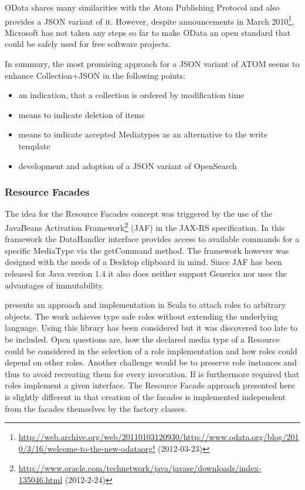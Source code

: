\documentclass[12pt,a4paper,twoside]{scrartcl}		%
\newcommand{\citeurl}[2]{\url{#1} (#2)}
\begin{document}
OData shares many similarities with the Atom Publishing Protocol and also
provides a JSON variant of it. However, despite announcements in March
2010\footnote{\citeurl{http://web.archive.org/web/20110103120930/http://www.odata.org/blog/2010/3/16/welcome-to-the-new-odataorg!}{2012-03-23}},
Microsoft has not taken any steps so far to make OData an open standard that
could be safely used for free software projects.

In summary, the most promising approach for a JSON variant of ATOM seems to
enhance Collection+JSON in the following points:

\begin{itemize}
\item an indication, that a collection is ordered by modification time
\item means to indicate deletion of items
\item means to indicate accepted Mediatypes as an alternative to the write
  template
\item development and adoption of a JSON variant of OpenSearch
\end{itemize}


\subsubsection{Resource Facades}
\label{sec:resourcefacadesfuture-work}

The idea for the Resource Facades concept was triggered by the use of the
JavaBeans Activation
Framework\footnote{\citeurl{http://www.oracle.com/technetwork/java/javase/downloads/index-135046.html}{2012-2-24}}
(JAF) in the JAX-RS specification. In this framework the DataHandler interface
provides access to available commands for a specific MediaType via the
getCommand method. The framework however was designed with the needs of a
Desktop clipboard in mind. Since JAF has been released for Java version 1.4 it
also does neither support Generics nor uses the advantages of immutability.

\cite{Pradel2008a} presents an approach and implementation in Scala to attach
roles to arbitrary objects. The work achieves type safe roles without extending
the underlying language. Using this library has been considered but it was
discovered too late to be included. Open questions are, how the declared media
type of a Resource could be considered in the selection of a role implementation
and how roles could depend on other roles. Another challenge would be to
preserve role instances and thus to avoid recreating them for every
invocation. If is furthermore required that roles implement a given
interface. The Resource Facade approach presented here is slightly different in
that creation of the facades is implemented independent from the facades
themselves by the factory classes.
\end{document}
